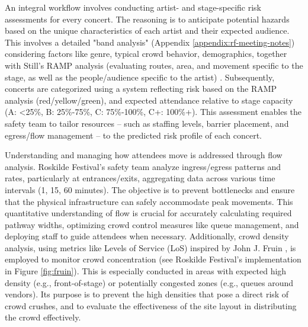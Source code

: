 An integral workflow involves conducting artist- and stage-specific risk assessments for every concert. The reasoning is to anticipate potential hazards based on the unique characteristics of each artist and their expected audience. This involves a detailed "band analysis" (Appendix \ref{appendix:rf-meeting-notes}) considering factors like genre, typical crowd behavior, demographics, together with Still's RAMP analysis (evaluating routes, area, and movement specific to the stage, as well as the people/audience specific to the artist) \cite{ramp}. Subsequently, concerts are categorized using a system reflecting risk based on the RAMP analysis (red/yellow/green), and expected attendance relative to stage capacity (A: <25\%, B: 25\%-75\%, C: 75\%-100\%, C+: 100\%+). This assessment enables the safety team to tailor resources -- such as staffing levels, barrier placement, and egress/flow management -- to the predicted risk profile of each concert.

Understanding and managing how attendees move is addressed through flow analysis. Roskilde Festival's safety team analyze ingress/egress patterns and rates, particularly at entrances/exits, aggregating data across various time intervals (1, 15, 60 minutes). The objective is to prevent bottlenecks and ensure that the physical infrastructure can safely accommodate peak movements. This quantitative understanding of flow is crucial for accurately calculating required pathway widths, optimizing crowd control measures like queue management, and deploying staff to guide attendees when necessary. Additionally, crowd density analysis, using metrics like Levels of Service (LoS) inspired by John J. Fruin \cite{fruin}, is employed to monitor crowd concentration (see Roskilde Festival's implementation in Figure \ref{fig:fruin}). This is especially conducted in areas with expected high density (e.g., front-of-stage) or potentially congested zones (e.g., queues around vendors). Its purpose is to prevent the high densities that pose a direct risk of crowd crushes, and to evaluate the effectiveness of the site layout in distributing the crowd effectively.

